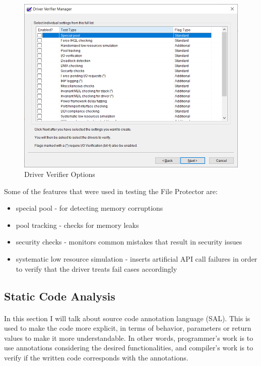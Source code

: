 		\begin{figure}[h!]
			\begin{center}
				\includegraphics[scale=0.8]{images/DriverVerifier.png}
				\caption{Driver Verifier Options}
				\label{fig:DriverVerifierOptions}
			\end{center}
		\end{figure}
		
		\newpage
		Some of the features that were used in testing the File Protector are:
		\begin{itemize}
			\item special pool - for detecting memory corruptions
			\item pool tracking - checks for memory leaks
			\item security checks - monitors common mistakes that result in security issues
			\item systematic low resource simulation - inserts artificial API call failures in order to verify that the driver treats fail cases accordingly 
		\end{itemize}
		
		\subsection{Static Code Analysis}
		\paragraph{}
		In this section I will talk about source code annotation language (SAL). This is used to make the code more explicit, in terms of behavior, parameters or return values to make it more understandable. In other words, programmer's work is to use annotations considering the desired functionalities, and compiler's work is to verify if the written code corresponds with the annotations. 
		
